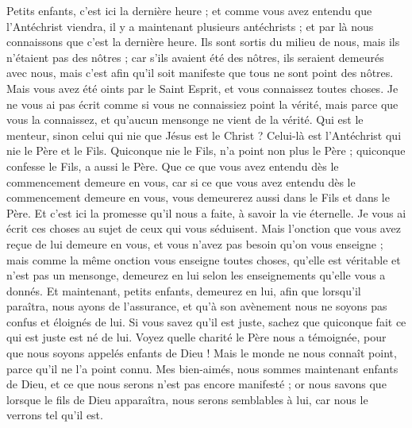 \begin{multicols}{2}
Petits enfants, c'est ici la dernière{} heure ; et comme vous avez entendu que l'Antéchrist viendra, il y a maintenant plusieurs antéchrists ; et par là nous connaissons que c'est la dernière heure.
Ils sont sortis du milieu de nous, mais ils n'étaient pas des nôtres ; car s'ils avaient été des nôtres, ils seraient demeurés avec nous, mais c'est afin qu'il soit manifeste que tous ne sont point des nôtres.
Mais vous avez été oints par le Saint Esprit, et vous connaissez toutes choses.
Je ne vous ai pas écrit comme si vous ne connaissiez point la vérité, mais parce que vous la connaissez, et qu'aucun mensonge ne vient de la vérité.
Qui est le menteur, sinon celui qui nie que Jésus est le Christ ? Celui-là est l'Antéchrist qui nie le Père et le Fils.
Quiconque nie le Fils, n'a point non plus le Père ; quiconque confesse le Fils, a aussi le Père.
Que ce que vous avez entendu dès le commencement demeure en vous, car si ce que vous avez entendu dès le commencement demeure en vous, vous demeurerez aussi dans le Fils et dans le Père.
Et c'est ici la promesse qu'il nous a faite, à savoir la vie éternelle.
Je vous ai écrit ces choses au sujet de ceux qui vous séduisent.
Mais l'onction que vous avez reçue de lui demeure en vous, et vous n'avez pas besoin qu'on vous enseigne ; mais comme la même onction vous enseigne toutes choses, qu'elle est véritable et n'est pas un mensonge, demeurez en lui selon les enseignements qu’elle vous a donnés.
Et maintenant, petits enfants, demeurez en lui, afin que lorsqu’il paraîtra, nous ayons de l’assurance, et qu’à son avènement{} nous ne soyons pas confus et éloignés de lui.
Si vous savez qu'il est juste, sachez que quiconque fait ce qui est juste est né de lui.
\VerseOne{}Voyez quelle charité le Père nous a témoignée, pour que nous soyons appelés enfants de Dieu ! Mais le monde ne nous connaît point, parce qu'il ne l'a point connu.
Mes bien-aimés, nous sommes maintenant enfants de Dieu, et ce que nous serons n'est pas encore manifesté ; or nous savons que lorsque le fils de Dieu apparaîtra, nous serons semblables à lui, car nous le verrons tel qu'il est.

\end{multicols}
